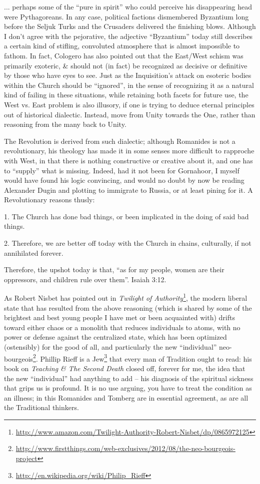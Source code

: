 ... perhaps some of the ``pure in spirit'' who could perceive his disappearing head were Pythagoreans. In any case, political factions dismembered Byzantium long before the Seljuk Turks and the Crusaders delivered the finishing blows. Although I don't agree with the pejorative, the adjective ``Byzantium'' today still describes a certain kind of stifling, convoluted atmosphere that is almost impossible to fathom. In fact, Cologero has also pointed out that the East/West schism was primarily exoteric, \& should not (in fact) be recognized as decisive or definitive by those who have eyes to see. Just as the Inquisition's attack on esoteric bodies within the Church should be ``ignored'', in the sense of recognizing it as a natural kind of failing in these situations, while retaining both facets for future use, the West vs. East problem is also illusory, if one is trying to deduce eternal principles out of historical dialectic. Instead, move from Unity towards the One, rather than reasoning from the many back to Unity.

The Revolution is derived from such dialectic; although Romanides is not a revolutionary, his theology has made it in some senses more difficult to rapproche with West, in that there is nothing constructive or creative about it, and one has to ``supply'' what is missing. Indeed, had it not been for Gornahoor, I myself would have found his logic convincing, and would no doubt by now be reading Alexander Dugin and plotting to immigrate to Russia, or at least pining for it. A Revolutionary reasons thusly:

1. The Church has done bad things, or been implicated in the doing of said bad things.

2. Therefore, we are better off today with the Church in chains, culturally, if not annihilated forever.

Therefore, the upshot today is that, ``as for my people, women are their oppressors, and children rule over them''. Isaiah 3:12.

As Robert Nisbet has pointed out in \emph{Twilight of Authority}\footnote{\url{http://www.amazon.com/Twilight-Authority-Robert-Nisbet/dp/0865972125}}, the modern liberal state that has resulted from the above reasoning (which is shared by some of the brightest and best young people I have met or been acquainted with) drifts toward either chaos or a monolith that reduces individuals to atoms, with no power or defense against the centralized state, which has been optimized (ostensibly) for the good of all, and particularly the new ``individual'' neo-bourgeois\footnote{\url{http://www.firstthings.com/web-exclusives/2012/08/the-neo-bourgeois-project}}. Phillip Rieff is a Jew\footnote{\url{http://en.wikipedia.org/wiki/Philip_Rieff}} that every man of Tradition ought to read: his book on \emph{Teaching \& The Second Death} closed off, forever for me, the idea that the new ``individual'' had anything to add -- his diagnosis of the spiritual sickness that grips us is profound. It is no use arguing, you have to treat the condition as an illness; in this Romanides and Tomberg are in essential agreement, as are all the Traditional thinkers.

